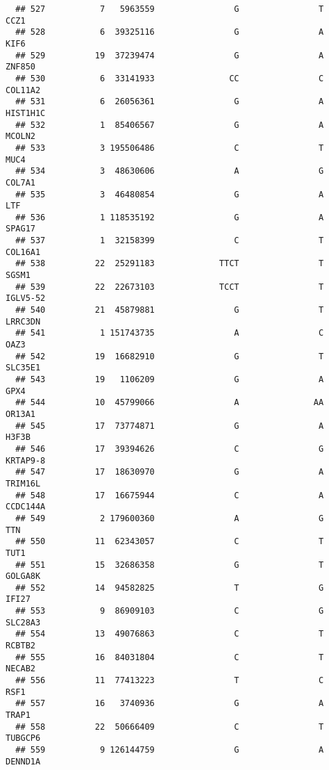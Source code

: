 \documentclass[12pt,twoside]{reedthesis}
\theoremstyle{definition}
\theoremstyle{definition}
\theoremstyle{remark}
\begin{document}
\begin{verbatim}
  ## 527           7   5963559                G                T           CCZ1
  ## 528           6  39325116                G                A           KIF6
  ## 529          19  37239474                G                A         ZNF850
  ## 530           6  33141933               CC                C        COL11A2
  ## 531           6  26056361                G                A       HIST1H1C
  ## 532           1  85406567                G                A         MCOLN2
  ## 533           3 195506486                C                T           MUC4
  ## 534           3  48630606                A                G         COL7A1
  ## 535           3  46480854                G                A            LTF
  ## 536           1 118535192                G                A         SPAG17
  ## 537           1  32158399                C                T        COL16A1
  ## 538          22  25291183             TTCT                T          SGSM1
  ## 539          22  22673103             TCCT                T       IGLV5-52
  ## 540          21  45879881                G                T        LRRC3DN
  ## 541           1 151743735                A                C           OAZ3
  ## 542          19  16682910                G                T        SLC35E1
  ## 543          19   1106209                G                A           GPX4
  ## 544          10  45799066                A               AA         OR13A1
  ## 545          17  73774871                G                A          H3F3B
  ## 546          17  39394626                C                G       KRTAP9-8
  ## 547          17  18630970                G                A        TRIM16L
  ## 548          17  16675944                C                A       CCDC144A
  ## 549           2 179600360                A                G            TTN
  ## 550          11  62343057                C                T           TUT1
  ## 551          15  32686358                G                T        GOLGA8K
  ## 552          14  94582825                T                G          IFI27
  ## 553           9  86909103                C                G        SLC28A3
  ## 554          13  49076863                C                T         RCBTB2
  ## 555          16  84031804                C                T         NECAB2
  ## 556          11  77413223                T                C           RSF1
  ## 557          16   3740936                G                A          TRAP1
  ## 558          22  50666409                C                T        TUBGCP6
  ## 559           9 126144759                G                A        DENND1A

\end{verbatim}
\end{document}
